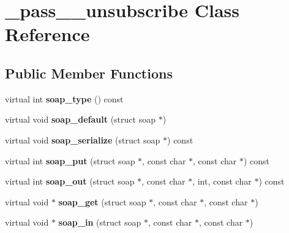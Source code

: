 \hypertarget{class__pass____unsubscribe}{
\section{\_\-pass\_\-\_\-unsubscribe Class Reference}
\label{class__pass____unsubscribe}
}
\subsection*{Public Member Functions}
\begin{DoxyCompactItemize}
\item 
\hypertarget{class__pass____unsubscribe_a090c72830c7366f1bcc27105c80fcdd9}{
virtual int {\bfseries soap\_\-type} () const }
\label{class__pass____unsubscribe_a090c72830c7366f1bcc27105c80fcdd9}

\item 
\hypertarget{class__pass____unsubscribe_aa33a4a0593afd1b3815c0b1ef2c21a91}{
virtual void {\bfseries soap\_\-default} (struct soap $\ast$)}
\label{class__pass____unsubscribe_aa33a4a0593afd1b3815c0b1ef2c21a91}

\item 
\hypertarget{class__pass____unsubscribe_a0f06633c7cf08850fea0e856a8b21d43}{
virtual void {\bfseries soap\_\-serialize} (struct soap $\ast$) const }
\label{class__pass____unsubscribe_a0f06633c7cf08850fea0e856a8b21d43}

\item 
\hypertarget{class__pass____unsubscribe_aa91583f10f5fe4ead3552520229b9cba}{
virtual int {\bfseries soap\_\-put} (struct soap $\ast$, const char $\ast$, const char $\ast$) const }
\label{class__pass____unsubscribe_aa91583f10f5fe4ead3552520229b9cba}

\item 
\hypertarget{class__pass____unsubscribe_a64e3e18f0b25781524558dc92fee3921}{
virtual int {\bfseries soap\_\-out} (struct soap $\ast$, const char $\ast$, int, const char $\ast$) const }
\label{class__pass____unsubscribe_a64e3e18f0b25781524558dc92fee3921}

\item 
\hypertarget{class__pass____unsubscribe_ab9ac29ac81b095eeb6e48e990b487399}{
virtual void $\ast$ {\bfseries soap\_\-get} (struct soap $\ast$, const char $\ast$, const char $\ast$)}
\label{class__pass____unsubscribe_ab9ac29ac81b095eeb6e48e990b487399}

\item 
\hypertarget{class__pass____unsubscribe_a5480e1f4f95aaeec36c7359b69da2e9d}{
virtual void $\ast$ {\bfseries soap\_\-in} (struct soap $\ast$, const char $\ast$, const char $\ast$)}
\label{class__pass____unsubscribe_a5480e1f4f95aaeec36c7359b69da2e9d}

\end{DoxyCompactItemize}
